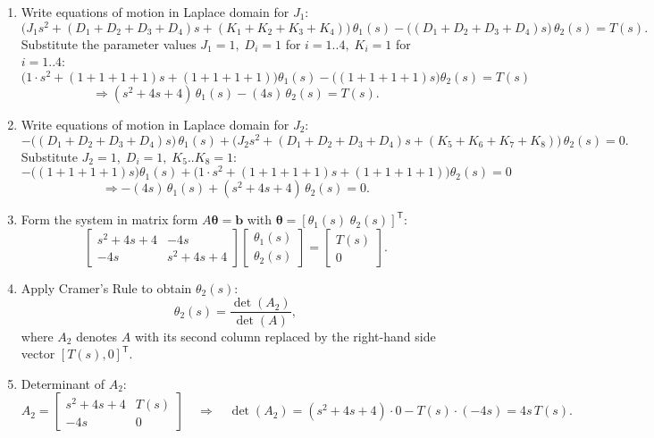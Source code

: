 \documentclass[11pt]{article}
\begin{document}
\begin{enumerate}[label=(\alph*), itemindent=*, leftmargin=*, nolistsep]
     \item Write equations of motion in Laplace domain for \(J_1\):
    \[
    \big(J_1 s^2 + (D_1+D_2+D_3+D_4)s + (K_1+K_2+K_3+K_4)\big)\,\theta_1(s)
    - \big((D_1+D_2+D_3+D_4)s\big)\,\theta_2(s) = T(s).
    \]
    Substitute the parameter values \(J_1=1,\; D_i=1\) for \(i=1..4,\; K_i=1\) for \(i=1..4\):
    \[
    \big(1\cdot s^2 + (1+1+1+1)s + (1+1+1+1)\big)\theta_1(s)
    - \big((1+1+1+1)s\big)\theta_2(s) = T(s)
    \]
    \[
    \Rightarrow (s^2 + 4s + 4)\,\theta_1(s) - (4s)\,\theta_2(s) = T(s).
    \]

    \item Write equations of motion in Laplace domain for \(J_2\):
    \[
    -\big((D_1+D_2+D_3+D_4)s\big)\,\theta_1(s)
    + \big(J_2 s^2 + (D_1+D_2+D_3+D_4)s + (K_5+K_6+K_7+K_8)\big)\,\theta_2(s) = 0.
    \]
    Substitute \(J_2=1,\; D_i=1,\; K_5..K_8=1\):
    \[
    -\big((1+1+1+1)s\big)\theta_1(s) + \big(1\cdot s^2 + (1+1+1+1)s + (1+1+1+1)\big)\theta_2(s) = 0
    \]
    \[
    \Rightarrow -(4s)\,\theta_1(s) + (s^2 + 4s + 4)\,\theta_2(s) = 0.
    \]

    \item Form the system in matrix form \(A\boldsymbol{\theta}=\boldsymbol{b}\) with \(\boldsymbol{\theta}=[\theta_1(s)\;\theta_2(s)]^\mathsf{T}\):
    \[
    \begin{bmatrix}
    s^2 + 4s + 4 & -4s \\
    -4s & s^2 + 4s + 4
    \end{bmatrix}
    \begin{bmatrix}
    \theta_1(s) \\[4pt] \theta_2(s)
    \end{bmatrix}
    =
    \begin{bmatrix}
    T(s) \\[4pt] 0
    \end{bmatrix}.
    \]

    \item Apply Cramer's Rule to obtain \(\theta_2(s)\):
    \[
    \theta_2(s) = \frac{\det(A_2)}{\det(A)},
    \]
    where \(A_2\) denotes \(A\) with its second column replaced by the right-hand side vector \([T(s),0]^\mathsf{T}\).

    \item Determinant of \(A_2\):
    \[
    A_2 = \begin{bmatrix}
    s^2+4s+4 & T(s) \\
    -4s & 0
    \end{bmatrix}
    \quad\Longrightarrow\quad
    \det(A_2) = (s^2+4s+4)\cdot 0 - T(s)\cdot(-4s) = 4s\,T(s).
    \]


\end{enumerate}
\end{document}
